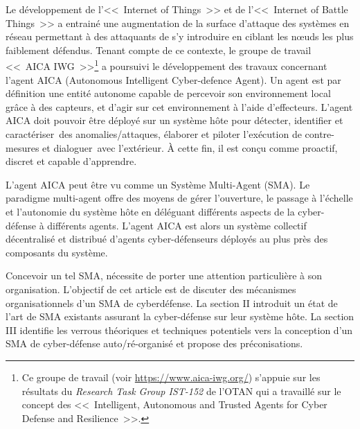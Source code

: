 \documentclass[conference]{IEEEtran}
\begin{document}
Le développement de l'<<~Internet of Things~>> et de l'<<~Internet of Battle Things~>>  a entrainé une augmentation de la surface d'attaque des systèmes en réseau permettant à des attaquants de s'y introduire en ciblant les nœuds les plus faiblement défendus. Tenant compte de ce contexte, le groupe de travail <<~AICA IWG~>>\footnote{Ce groupe de travail (voir \url{https://www.aica-iwg.org/}) s'appuie sur les résultats du \textit{Research Task Group IST-152} de l'OTAN qui a travaillé sur le concept des <<~Intelligent, Autonomous and Trusted Agents for Cyber Defense and Resilience~>>.} a poursuivi le développement des travaux concernant l'agent AICA (Autonomous Intelligent Cyber-defence Agent).
Un agent est par définition une entité autonome capable de percevoir son environnement local grâce à des capteurs, et d’agir sur cet environnement à l'aide d'effecteurs\cite{russell1995modern}.
L'agent AICA doit pouvoir être déployé sur un système hôte pour détecter, identifier et caractériser des anomalies/attaques, élaborer et piloter l’exécution de contre-mesures et dialoguer avec l'extérieur. À cette fin, il est conçu comme proactif, discret et capable d’apprendre.




L'agent AICA peut être vu comme un Système Multi-Agent (SMA). Le paradigme multi-agent offre des moyens de gérer l'ouverture, le passage à l'échelle et l'autonomie du système hôte en déléguant différents aspects de la cyber-défense à différents agents. L'agent AICA  est alors un système collectif décentralisé et distribué d'agents cyber-défenseurs déployés au plus près des composants du système\cite{ieeesp_KottT20}.

Concevoir un tel SMA, nécessite de porter une attention particulière à son organisation. L'objectif de cet article est de discuter des mécanismes organisationnels d'un SMA de cyberdéfense.
La section II introduit un état de l'art de SMA existants assurant la cyber-défense sur leur système hôte. La section III identifie les verrous théoriques et techniques potentiels vers la conception d'un SMA de cyber-défense auto/ré-organisé et propose des préconisations.
\end{document}
